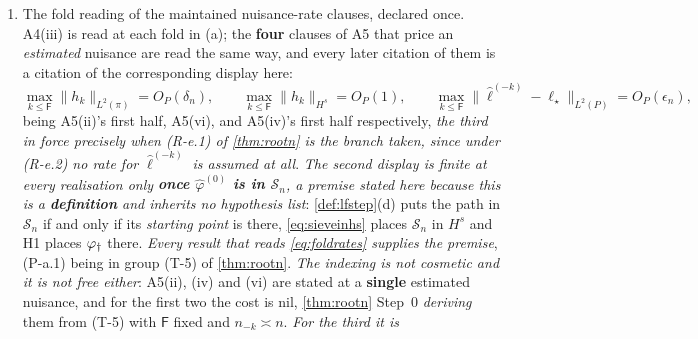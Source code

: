 \begin{definition}
\begin{enumerate}
\begin{enumerate}
\end{enumerate}
\item[(d)] The fold reading of the maintained nuisance-rate clauses, declared once. A4(iii) is read
at each fold in (a); the \textbf{four} clauses of A5 that price an \emph{estimated} nuisance are read the
same way, and every later citation of them is a citation of the corresponding display here:
\begin{equation}\label{eq:foldrates}
\max_{k\le\mathsf F}\big\|h_k\big\|_{L^{2}(\pi)}=O_P(\delta_n),
\qquad
\max_{k\le\mathsf F}\big\|h_k\big\|_{H^{s}}=O_P(1),
\qquad
\max_{k\le\mathsf F}\big\|\hat\ell^{(-k)}-\ell_\star\big\|_{L^{2}(P)}=O_P(\epsilon_n),
\end{equation}
being A5(ii)'s first half, A5(vi), and A5(iv)'s first half respectively, \emph{the third in force precisely
when (R-e.1) of \cref{thm:rootn} is the branch taken, since under (R-e.2) no rate for $\hat\ell^{(-k)}$ is
assumed at all}. \emph{The second display is finite at every realisation only
\textbf{once $\hat\varphi^{(0)}$ is in $\mathcal S_n$}, a premise stated here because this is a
\textbf{definition} and inherits no hypothesis list}: \cref{def:lfstep}\textup{(d)} puts the path in
$\mathcal S_n$ if and only if its \emph{starting point} is there, \eqref{eq:sieveinhs} places
$\mathcal S_n$ in $H^{s}$ and H1 places $\varphi_{\dagger}$ there. \emph{Every result that reads
\eqref{eq:foldrates} supplies the premise}, (P-a.1) being in group (T-5) of \cref{thm:rootn}.
\emph{The indexing is not cosmetic and it is not free either}: A5(ii), (iv) and (vi) are stated at a
\textbf{single} estimated nuisance, and for the first two the cost is nil, \cref{thm:rootn} Step~0
\emph{deriving} them from (T-5) with $\mathsf F$ fixed and $n_{-k}\asymp n$. \emph{For the third it is
}
\end{enumerate}
\end{definition}
